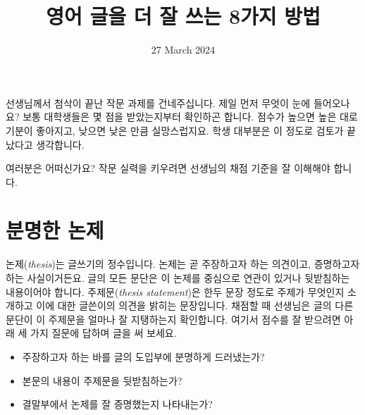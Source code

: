 \documentclass{translation}
\date{27 March 2024}
\title{영어 글을 더 잘 쓰는 8가지 방법}
\begin{document}
선생님께서 첨삭이 끝난 작문 과제를 건네주십니다.
제일 먼저 무엇이 눈에 들어오나요?
보통 대학생들은 몇 점을 받았는지부터 확인하곤 합니다.
점수가 높으면 높은 대로 기분이 좋아지고, 낮으면 낮은 만큼 실망스럽지요.
학생 대부분은 이 정도로 검토가 끝났다고 생각합니다.

여러분은 어떠신가요?
작문 실력을 키우려면 선생님의 채점 기준을 잘 이해해야 합니다.

\section{분명한 논제}

논제(\textit{thesis})는 글쓰기의 정수입니다.
논제는 곧 주장하고자 하는 의견이고, 증명하고자 하는 사실이거든요.
글의 모든 문단은 이 논제를 중심으로 연관이 있거나 뒷받침하는 내용이어야 합니다.
주제문(\textit{thesis statement})은 한두 문장 정도로 주제가 무엇인지 소개하고 이에 대한 글쓴이의 의견을 밝히는 문장입니다.
채점할 때 선생님은 글의 다른 문단이 이 주제문을 얼마나 잘 지탱하는지 확인합니다.
여기서 점수를 잘 받으려면 아래 세 가지 질문에 답하며 글을 써 보세요.

\begin{itemize}
\item 주장하고자 하는 바를 글의 도입부에 분명하게 드러냈는가?
\item 본문의 내용이 주제문을 뒷받침하는가?
\item 결말부에서 논제를 잘 증명했는지 나타내는가?
\end{itemize}
\end{document}
